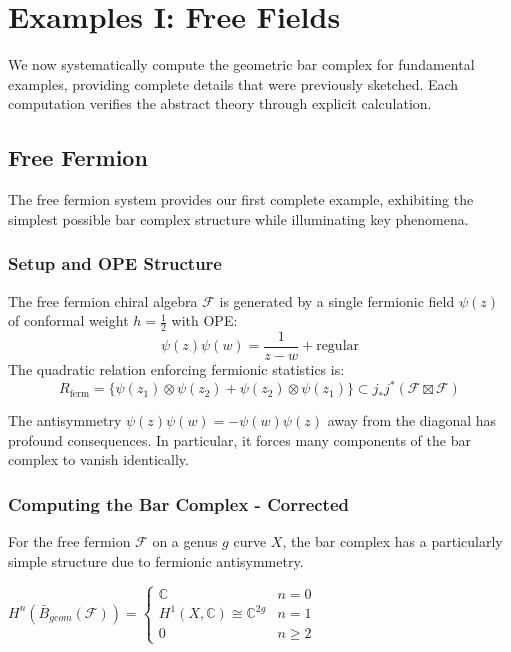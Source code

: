 \section{Examples I: Free Fields}
 
We now systematically compute the geometric bar complex for fundamental examples, providing complete 
details that were previously sketched. Each computation verifies the abstract theory through explicit 
calculation.
 
\subsection{Free Fermion}
 
The free fermion system provides our first complete example, exhibiting the simplest possible bar complex 
structure while illuminating key phenomena.
 
\subsubsection{Setup and OPE Structure}
 
\begin{definition}
The free fermion chiral algebra $\mathcal{F}$ is generated by a single fermionic field $\psi(z)$ of 
conformal weight $h = \frac{1}{2}$ with OPE:
\[
\psi(z)\psi(w) = \frac{1}{z-w} + \text{regular}
\]
The quadratic relation enforcing fermionic statistics is:
\[
R_{\text{ferm}} = \{\psi(z_1) \otimes \psi(z_2) + \psi(z_2) \otimes \psi(z_1)\} \subset 
j_*j^*(\mathcal{F} \boxtimes \mathcal{F})
\]
\end{definition}
 
\begin{remark}
The antisymmetry $\psi(z)\psi(w) = -\psi(w)\psi(z)$ away from the diagonal has profound consequences. 
In particular, it forces many components of the bar complex to vanish identically.
\end{remark}
 
\subsubsection{Computing the Bar Complex - Corrected}

\begin{theorem}
For the free fermion $\mathcal{F}$ on a genus $g$ curve $X$, the bar complex has a particularly simple structure due to fermionic antisymmetry.


$H^n(\bar{B}_{geom}(\mathcal{F})) = \begin{cases}
\mathbb{C} & n = 0\\
H^1(X, \mathbb{C}) \cong \mathbb{C}^{2g} & n = 1\\
0 & n \geq 2
\end{cases}$
\end{theorem}


